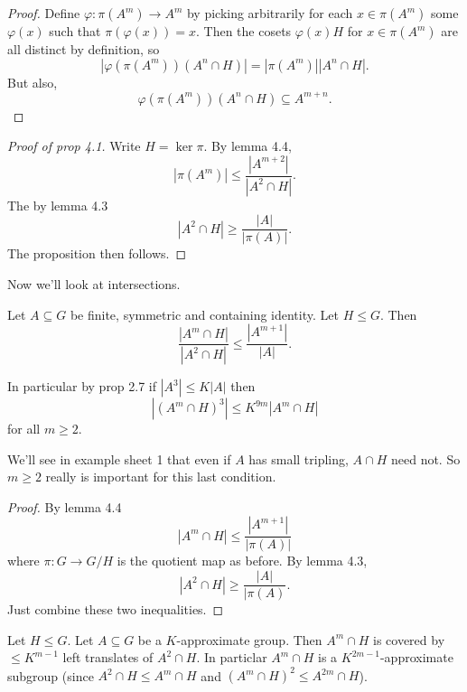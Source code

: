 \documentclass[a4paper]{article}
\begin{document}
\begin{proof}
  Define \(\varphi: \pi(A^m) \to A^m\) by picking arbitrarily for each \(x \in \pi(A^m)\) some \(\varphi(x)\) such that \(\pi(\varphi(x)) = x\). Then the cosets \(\varphi(x)H\) for \(x \in \pi(A^m)\) are all distinct by definition, so
  \[
    |\varphi(\pi(A^m)) (A^n \cap H)| = |\pi(A^m)| |A^n \cap H|.
  \]
  But also,
  \[
    \varphi(\pi(A^m)) (A^n \cap H) \subseteq A^{m + n}.
  \]
\end{proof}

\begin{proof}[Proof of prop 4.1]
  Write \(H = \ker \pi\). By lemma 4.4,
  \[
    |\pi(A^m)| \leq \frac{|A^{m + 2}|}{|A^2 \cap H|}.
  \]
  The by lemma 4.3
  \[
    |A^2 \cap H| \geq \frac{|A|}{|\pi(A)|}.
  \]
  The proposition then follows.
\end{proof}

Now we'll look at intersections.

\begin{proposition}
  Let \(A \subseteq G\) be finite, symmetric and containing identity. Let \(H \leq G\). Then
  \[
    \frac{|A^m \cap H|}{|A^2 \cap H|} \leq \frac{|A^{m + 1}|}{|A|}.
  \]

  In particular by prop 2.7 if \(|A^3| \leq K|A|\) then
  \[
    |(A^m \cap H)^3| \leq K^{9m} |A^m \cap H|
  \]
  for all \(m \geq 2\).
\end{proposition}

\begin{remark}
  We'll see in example sheet 1 that even if \(A\) has small tripling, \(A \cap H\) need not. So \(m \geq 2\) really is important for this last condition.
\end{remark}

\begin{proof}
  By lemma 4.4
  \[
    |A^m \cap H| \leq \frac{|A^{m + 1}|}{|\pi(A)|}
  \]
  where \(\pi: G \to G/H\) is the quotient map as before. By lemma 4.3,
  \[
    |A^2 \cap H| \geq \frac{|A|}{|\pi(A)}.
  \]
  Just combine these two inequalities.
\end{proof}

\begin{proposition}
  Let \(H \leq G\). Let \(A \subseteq G\) be a \(K\)-approximate group. Then \(A^m \cap H\) is covered by \(\leq K^{m - 1}\) left translates of \(A^2 \cap H\). In particlar \(A^m \cap H\) is a \(K^{2m - 1}\)-approximate subgroup (since \(A^2 \cap H \leq A^m \cap H\) and \((A^m \cap H)^2 \leq A^{2m} \cap H\)).
\end{proposition}
\end{document}
